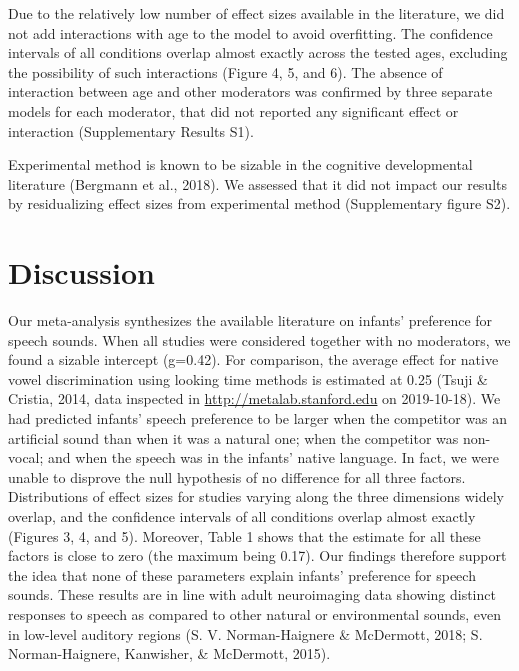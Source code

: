 \documentclass[man]{apa6}
\begin{document}
Due to the relatively low number of effect sizes available in the
literature, we did not add interactions with age to the model to avoid
overfitting. The confidence intervals of all conditions overlap almost
exactly across the tested ages, excluding the possibility of such
interactions (Figure 4, 5, and 6). The absence of interaction between
age and other moderators was confirmed by three separate models for each
moderator, that did not reported any significant effect or interaction
(Supplementary Results S1).

Experimental method is known to be sizable in the cognitive
developmental literature (Bergmann et al., 2018). We assessed that it
did not impact our results by residualizing effect sizes from
experimental method (Supplementary figure S2).

\section{Discussion}\label{discussion}

Our meta-analysis synthesizes the available literature on infants'
preference for speech sounds. When all studies were considered together
with no moderators, we found a sizable intercept (g=0.42). For
comparison, the average effect for native vowel discrimination using
looking time methods is estimated at 0.25 (Tsuji \& Cristia, 2014, data
inspected in \url{http://metalab.stanford.edu} on 2019-10-18). We had
predicted infants' speech preference to be larger when the competitor
was an artificial sound than when it was a natural one; when the
competitor was non-vocal; and when the speech was in the infants' native
language. In fact, we were unable to disprove the null hypothesis of no
difference for all three factors. Distributions of effect sizes for
studies varying along the three dimensions widely overlap, and the
confidence intervals of all conditions overlap almost exactly (Figures
3, 4, and 5). Moreover, Table 1 shows that the estimate for all these
factors is close to zero (the maximum being 0.17). Our findings
therefore support the idea that none of these parameters explain
infants' preference for speech sounds. These results are in line with
adult neuroimaging data showing distinct responses to speech as compared
to other natural or environmental sounds, even in low-level auditory
regions (S. V. Norman-Haignere \& McDermott, 2018; S. Norman-Haignere,
Kanwisher, \& McDermott, 2015).
\end{document}
